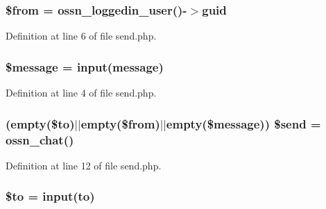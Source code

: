 \subsubsection[{\texorpdfstring{\$from}{$from}}]{\setlength{\rightskip}{0pt plus 5cm}\$from = {\bf ossn\+\_\+loggedin\+\_\+user}()-\/$>$guid}\hypertarget{_ossn_chat_2actions_2message_2send_8php_a0bb7e2b3d541598cc9c9e3b11bee859c}{}\label{_ossn_chat_2actions_2message_2send_8php_a0bb7e2b3d541598cc9c9e3b11bee859c}


Definition at line 6 of file send.\+php.

\subsubsection[{\texorpdfstring{\$message}{$message}}]{\setlength{\rightskip}{0pt plus 5cm}\$message = {\bf input}(\textquotesingle{}message\textquotesingle{})}\hypertarget{_ossn_chat_2actions_2message_2send_8php_abf17cb2dba2ed17cb28aa5f37deb5293}{}\label{_ossn_chat_2actions_2message_2send_8php_abf17cb2dba2ed17cb28aa5f37deb5293}


Definition at line 4 of file send.\+php.

\subsubsection[{\texorpdfstring{\$send}{$send}}]{ (empty(\$to)$\vert$$\vert$empty(\$from)$\vert$$\vert$empty(\$message)) \$send = {\bf ossn\+\_\+chat}()}\hypertarget{_ossn_chat_2actions_2message_2send_8php_adf45c16f44cc0796d52c418c0411ae82}{}\label{_ossn_chat_2actions_2message_2send_8php_adf45c16f44cc0796d52c418c0411ae82}


Definition at line 12 of file send.\+php.

\subsubsection[{\texorpdfstring{\$to}{$to}}]{\setlength{\rightskip}{0pt plus 5cm}\$to = {\bf input}(\textquotesingle{}to\textquotesingle{})}\hypertarget{_ossn_chat_2actions_2message_2send_8php_ac19f839b525d6d99d063fe56bf2a6d3b}{}\label{_ossn_chat_2actions_2message_2send_8php_ac19f839b525d6d99d063fe56bf2a6d3b}


